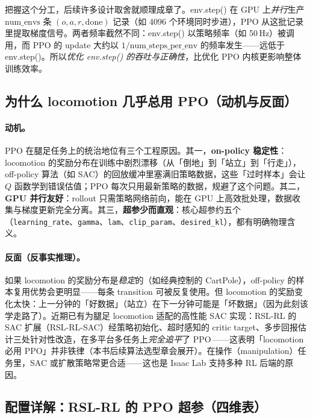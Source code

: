 \begin{insight}\label{ins:rlmc-mgr-producer}
把握这个分工，后续许多设计取舍就顺理成章了。env.step() 在 GPU 上\emph{并行}生产 $\text{num\_envs}$ 条 $(o,a,r,\text{done})$ 记录（如 4096 个环境同时步进），PPO 从这批记录里提取梯度信号。两者频率截然不同：env.step() 以策略频率（如 50\,Hz）被调用，而 PPO 的 update 大约以 $1/\text{num\_steps\_per\_env}$ 的频率发生——远低于 env.step()。所以\emph{优化 env.step() 的吞吐与正确性}，比优化 PPO 内核更影响整体训练效率。
\end{insight}

\subsection{为什么 locomotion 几乎总用 PPO（动机与反面）}

\paragraph{动机。}PPO 在腿足任务上的统治地位有三个工程原因。其一，\textbf{on-policy 稳定性}：locomotion 的奖励分布在训练中剧烈漂移（从「倒地」到「站立」到「行走」），off-policy 算法（如 SAC）的回放缓冲里塞满旧策略数据，这些「过时样本」会让 $Q$ 函数学到错误估值；PPO 每次只用最新策略的数据，规避了这个问题。其二，\textbf{GPU 并行友好}：rollout 只需策略网络前向，能在 GPU 上高效批处理，数据收集与梯度更新完全分离。其三，\textbf{超参少而直观}：核心超参约五个（\verb|learning_rate|、\verb|gamma|、\verb|lam|、\verb|clip_param|、\verb|desired_kl|），都有明确物理含义。

\paragraph{反面（反事实推理）。}如果 locomotion 的奖励分布是\emph{稳定}的（如经典控制的 CartPole），off-policy 的样本复用优势会更明显——每条 transition 可被反复使用。但 locomotion 的奖励变化太快：上一分钟的「好数据」（站立）在下一分钟可能是「坏数据」（因为此刻该学走路了）。近期已有为腿足 locomotion 适配的高性能 SAC 实现：RSL-RL 的 SAC 扩展（RSL-RL-SAC）经策略初始化、超时感知的 critic target、多步回报估计三处针对性改造，在多平台多任务上\emph{完全追平}了 PPO\,\cite{sabatini2026sac}——这表明「locomotion 必用 PPO」并非铁律（本书后续算法选型章会展开）。在操作（manipulation）任务里，SAC 或扩散策略常更合适——这也是 Isaac Lab 支持多种 RL 后端的原因。

\subsection{配置详解：RSL-RL 的 PPO 超参（四维表）}

